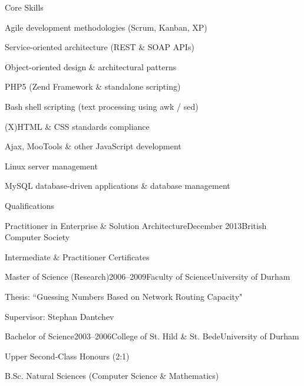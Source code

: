 \documentclass{cv}
\begin{document}
\begin{rSection}{Core Skills}

\begin{rSubsection}{}{}{}{}
\item Agile development methodologies (Scrum, Kanban, XP)
\item Service-oriented architecture (REST \& SOAP APIs)
\item Object-oriented design \& architectural patterns
\item PHP5 (Zend Framework \& standalone scripting)
\item Bash shell scripting (text processing using awk / sed)
\item (X)HTML \& CSS standards compliance
\item Ajax, MooTools \& other JavaScript development
\item Linux server management
\item MySQL database-driven applications \& database management
\end{rSubsection}

\end{rSection}


\begin{rSection}{Qualifications}

\begin{rSubsection}{Practitioner in Enterprise \& Solution Architecture}{December 2013}{British Computer Society}
\item Intermediate \& Practitioner Certificates
\end{rSubsection}

\begin{rSubsection}{Master of Science (Research)}{2006--2009}{Faculty of Science}{University of Durham}
\item Thesis: ``Guessing Numbers Based on Network Routing Capacity"
\item Supervisor: Stephan Dantchev
\end{rSubsection}

\begin{rSubsection}{Bachelor of Science}{2003--2006}{College of St. Hild \& St. Bede}{University of Durham}
\item Upper Second-Class Honours (2:1)
\item B.Sc. Natural Sciences (Computer Science \& Mathematics)
\end{rSubsection}

\end{rSection}
\end{document}
